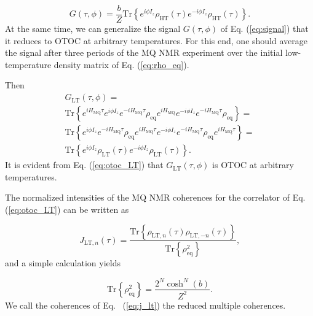 \documentclass[
    pra,  
    twocolumn, 
    floatfix, 
    amsmath, 
    amssymb, 
    superscriptaddress
]{revtex4-1}
\begin{document}
\begin{equation}
    \label{eq:otoc_HT}
    G(\tau, \phi) = \frac b Z\mathrm{Tr}\left\{ 
    e^{i \phi I_z} 
    \rho_\mathrm{HT} (\tau) 
    e^{-i \phi I_z} 
    \rho_\mathrm{HT}(\tau) 
    \right\}.
\end{equation}
At the same time, we can generalize the signal $G(\tau, \phi)$ of Eq. (\ref{eq:signal}) that it reduces to OTOC at arbitrary temperatures. For this end, one should average the signal after three periods of the MQ NMR experiment \cite{mq_nmr_experiment} over the initial low-temperature density matrix of Eq. (\ref{eq:rho_eq}).

Then 
\begin{multline}
    \label{eq:otoc_LT}
    G_\mathrm{LT}(\tau, \phi) = \\
  \mathrm{Tr}\left\{ 
        e^{i H_{\mathrm{MQ}} \tau} 
        e^{i \phi I_z} 
        e^{-i H_{\mathrm{MQ}} \tau} 
        \rho_{\mathrm{eq}}
        e^{i H_{\mathrm{MQ}}}
        e^{-i \phi I_z} 
        e^{-i H_{\mathrm{MQ}} \tau} 
        \rho_{\mathrm{eq}}
     \right\} = \\
   \mathrm{Tr}\left\{
         e^{i \phi I_z} 
         e^{-i H_\mathrm{MQ} \tau} 
         \rho_\mathrm{eq} 
         e^{i H_\mathrm{MQ} \tau} 
         e^{-i \phi I_z} 
         e^{-i H_\mathrm{MQ} \tau} 
         \rho_{\mathrm{eq}}
         e^{i H_\mathrm{MQ} \tau} 
     \right\} = \\
   \mathrm{Tr}\left\{ 
         e^{i \phi I_z} 
         \rho_\mathrm{LT} (\tau) 
         e^{-i \phi I_z} 
         \rho_\mathrm{LT} (\tau) 
     \right\}.
\end{multline}
It is evident from Eq. (\ref{eq:otoc_LT}) that $G_\mathrm{LT}(\tau, \phi)$ is OTOC at arbitrary temperatures.

The normalized intensities of the MQ NMR coherences for the correlator of Eq. (\ref{eq:otoc_LT}) can be written as 

\begin{equation}
    \label{eq:j_lt}
    J_{\mathrm{LT}, n}(\tau) = 
    \frac{\mathrm{Tr} \left\{ 
        \rho_{\mathrm{LT},n}(\tau)
        \rho_{\mathrm{LT}, -n}(\tau)
    \right\}}
    {\mathrm{Tr}\left\{\rho^2_\mathrm{eq}\right\}},             
\end{equation}
and a simple calculation yields

\begin{equation}
    \label{eq:j_lt_norm}
  \mathrm{Tr}\left\{\rho^2_\mathrm{eq}\right\} = 
    \frac{2^N \cosh^N(b)}{Z^2}.
\end{equation}
We call the coherences of Eq. ~(\ref{eq:j_lt}) the reduced multiple coherences.
\end{document}
